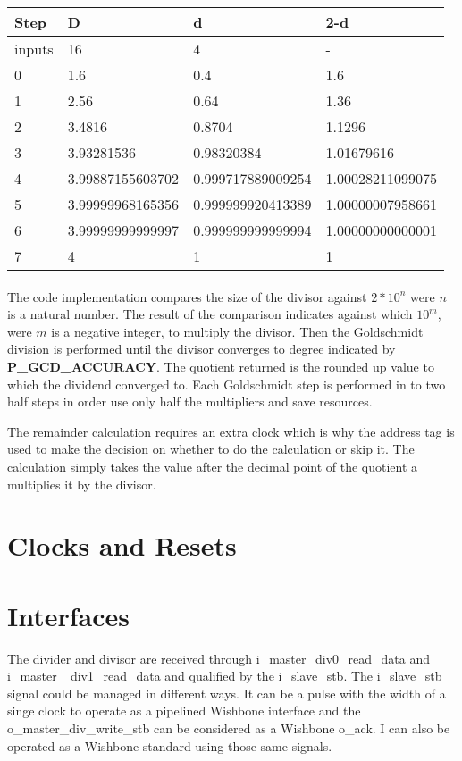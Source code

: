 \documentclass[letterpaper]{article}
\begin{document}
	\begin{tabular}{l|l|l|l}
		Step & D & d & 2-d \\ \hline
		inputs & 16 & 4 & - \\
		0 & 1.6 & 0.4 & 1.6 \\
		1 & 2.56 & 0.64 & 1.36 \\
		2 & 3.4816 & 0.8704 & 1.1296 \\
		3 & 3.93281536 & 0.98320384 & 1.01679616 \\
		4 & 3.99887155603702 & 0.999717889009254 & 1.00028211099075 \\
		5 & 3.99999968165356 & 0.999999920413389 & 1.00000007958661 \\
		6 & 3.99999999999997 & 0.999999999999994 & 1.00000000000001 \\
		7 & 4 & 1 & 1 \\
	\end{tabular}
	
	\paragraph{}The code implementation compares the size of the divisor against $ 2*10^n $ were $ n $ is a natural number. The result of the comparison indicates against which $ 10^m $, were $ m $ is a negative integer, to multiply the divisor. Then the Goldschmidt division is performed until the divisor converges to degree indicated by \textbf{P\_GCD\_ACCURACY}. The quotient returned is the rounded up value to which the dividend converged to. Each Goldschmidt step is performed in to two half steps in order use only half the multipliers and save resources.
	
	The remainder calculation requires an extra clock which is why the address tag is used to make the decision on whether to do the calculation or skip it. The calculation simply takes the value after the decimal point of the quotient a multiplies it by the divisor.
	
	\section{Clocks and Resets}
	
	\section{Interfaces}
	The divider and divisor are received through i\_master\_div0\_read\_data and i\_master \_div1\_read\_data and qualified by the i\_slave\_stb. The i\_slave\_stb signal could be managed in different ways. It can be a pulse with the width of a singe clock to operate as a pipelined Wishbone interface and the o\_master\_div\_write\_stb can be considered as a Wishbone o\_ack. I can also be operated as a Wishbone standard using those same signals.
	
\end{document}
